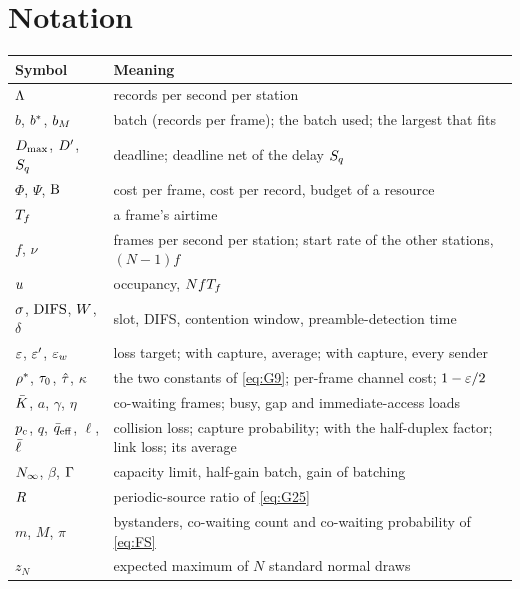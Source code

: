 \documentclass[11pt,a4paper]{article}
\begin{document}
\section{Notation}
\begin{table}[htbp]
\centering\small
\begin{tabular}{ll}
\toprule
Symbol & Meaning \\
\midrule
$\Lambda$ & records per second per station \\
$b$, $b^{\ast}$, $b_M$ & batch (records per frame); the batch used; the largest that fits \\
$D_{\max}$, $D'$, $S_q$ & deadline; deadline net of the delay $S_q$ \\
$\Phi$, $\Psi$, $\mathrm{B}$ & cost per frame, cost per record, budget of a resource \\
$T_f$ & a frame's airtime \\
$f$, $\nu$ & frames per second per station; start rate of the other stations, $(N-1)f$ \\
$u$ & occupancy, $N fT_f$ \\
$\sigma$, $\mathrm{DIFS}$, $W$, $\delta$ & slot, DIFS, contention window, preamble-detection time \\
$\varepsilon$, $\varepsilon'$, $\varepsilon_{w}$ & loss target; with capture, average; with capture, every sender \\
$\rho^{\ast}$, $\tau_0$, $\hat\tau$, $\kappa$ & the two constants of \eqref{eq:G9}; per-frame channel cost; $1-\varepsilon/2$ \\
$\bar K$, $a$, $\gamma$, $\eta$ & co-waiting frames; busy, gap and immediate-access loads \\
$p_c$, $q$, $\bar q_{\mathrm{eff}}$, $\ell$, $\bar\ell$ & collision loss; capture probability; with the half-duplex factor; link loss; its average \\
$N_{\infty}$, $\beta$, $\Gamma$ & capacity limit, half-gain batch, gain of batching \\
$R$ & periodic-source ratio of \eqref{eq:G25} \\
$m$, $M$, $\pi$ & bystanders, co-waiting count and co-waiting probability of \eqref{eq:FS} \\
$z_N$ & expected maximum of $N$ standard normal draws \\
\bottomrule
\end{tabular}
\end{table}

\end{document}
